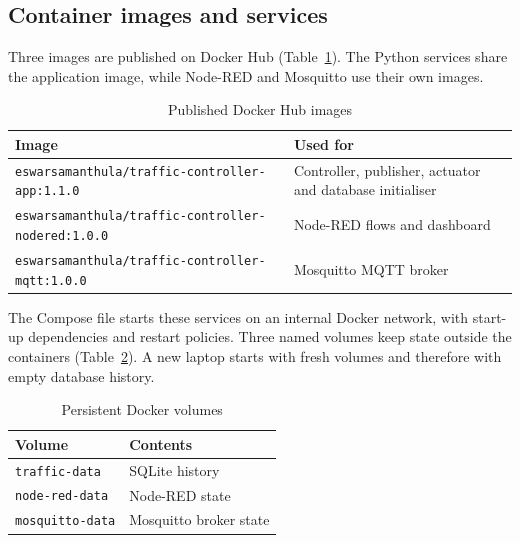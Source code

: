 \documentclass[12pt,a4paper,oneside]{report}
\begin{document}
\subsection{Container images and services}
Three images are published on Docker Hub (Table~\ref{tab:docker-images}). The Python services share the application image, while Node-RED and Mosquitto use their own images.

\begin{table}[htbp]\centering\small
\caption{Published Docker Hub images}\label{tab:docker-images}
\begin{tabular}{|p{}|p{}|}\hline
\textbf{Image} & \textbf{Used for} \\\hline
{\footnotesize\texttt{eswarsamanthula/\allowbreak traffic-controller-app:1.1.0}} & Controller, publisher, actuator and database initialiser \\\hline
{\footnotesize\texttt{eswarsamanthula/\allowbreak traffic-controller-nodered:1.0.0}} & Node-RED flows and dashboard \\\hline
{\footnotesize\texttt{eswarsamanthula/\allowbreak traffic-controller-mqtt:1.0.0}} & Mosquitto MQTT broker \\\hline
\end{tabular}\end{table}

The Compose file starts these services on an internal Docker network, with start-up dependencies and restart policies. Three named volumes keep state outside the containers (Table~\ref{tab:docker-volumes}). A new laptop starts with fresh volumes and therefore with empty database history.

\begin{table}[htbp]\centering\small
\caption{Persistent Docker volumes}\label{tab:docker-volumes}
\begin{tabular}{|p{}|p{}|}\hline
\textbf{Volume} & \textbf{Contents} \\\hline
\texttt{traffic-data} & SQLite history \\\hline
\texttt{node-red-data} & Node-RED state \\\hline
\texttt{mosquitto-data} & Mosquitto broker state \\\hline
\end{tabular}\end{table}
\end{document}

